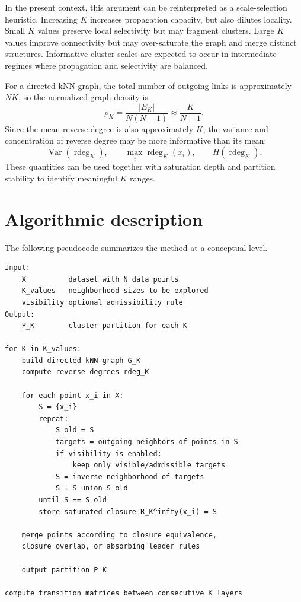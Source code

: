 \documentclass[11pt,a4paper]{article}
\newcommand{\rdeg}{\operatorname{rdeg}}
\begin{document}
In the present context, this argument can be reinterpreted as a scale-selection heuristic. Increasing $K$ increases propagation capacity, but also dilutes locality. Small $K$ values preserve local selectivity but may fragment clusters. Large $K$ values improve connectivity but may over-saturate the graph and merge distinct structures. Informative cluster scales are expected to occur in intermediate regimes where propagation and selectivity are balanced.

For a directed kNN graph, the total number of outgoing links is approximately $NK$, so the normalized graph density is
\begin{equation}
\rho_K=\frac{|E_K|}{N(N-1)}\approx\frac{K}{N-1}.
\end{equation}
Since the mean reverse degree is also approximately $K$, the variance and concentration of reverse degree may be more informative than its mean:
\begin{equation}
\operatorname{Var}(\rdeg_K),\qquad
\max_i\rdeg_K(x_i),\qquad
H(\rdeg_K).
\end{equation}
These quantities can be used together with saturation depth and partition stability to identify meaningful $K$ ranges.

\section{Algorithmic description}
\label{sec:algorithm}

The following pseudocode summarizes the method at a conceptual level.

\begin{verbatim}
Input:
    X          dataset with N data points
    K_values   neighborhood sizes to be explored
    visibility optional admissibility rule
Output:
    P_K        cluster partition for each K

for K in K_values:
    build directed kNN graph G_K
    compute reverse degrees rdeg_K

    for each point x_i in X:
        S = {x_i}
        repeat:
            S_old = S
            targets = outgoing neighbors of points in S
            if visibility is enabled:
                keep only visible/admissible targets
            S = inverse-neighborhood of targets
            S = S union S_old
        until S == S_old
        store saturated closure R_K^infty(x_i) = S

    merge points according to closure equivalence,
    closure overlap, or absorbing leader rules

    output partition P_K

compute transition matrices between consecutive K layers
\end{verbatim}
\end{document}
